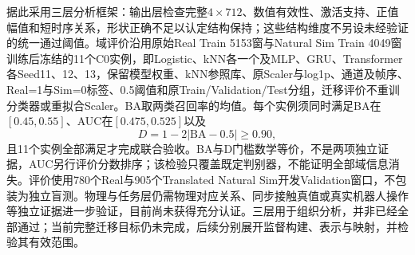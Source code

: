 据此采用三层分析框架：输出层检查完整$4\times712$、数值有效性、激活支持、正值幅值和短时序关系，形状正确不足以认定结构保持；这些结构维度不另设未经验证的统一通过阈值。域评价沿用原始Real Train 5153窗与Natural Sim Train 4049窗训练后冻结的11个C0实例，即Logistic、kNN各一个及MLP、GRU、Transformer各Seed11、12、13，保留模型权重、kNN参照库、原Scaler与log1p、通道及帧序、Real=1与Sim=0标签、0.5阈值和原Train/Validation/Test分组，迁移评价不重训分类器或重拟合Scaler。BA取两类召回率的均值。每个实例须同时满足BA在$[0.45,0.55]$、AUC在$[0.475,0.525]$以及
\begin{equation}
 D=1-2|\mathrm{BA}-0.5|\geq0.90,
 \label{eq:ch05_domain_confusion_target}
\end{equation}
且11个实例全部满足才完成联合验收。BA与D门槛数学等价，不是两项独立证据，AUC另行评价分数排序；该检验只覆盖既定判别器，不能证明全部域信息消失。评价使用780个Real与905个Translated Natural Sim开发Validation窗口，不包装为独立盲测。物理与任务层仍需物理对应关系、同步接触真值或真实机器人操作等独立证据进一步验证，目前尚未获得充分认证。三层用于组织分析，并非已经全部通过；当前完整迁移目标仍未完成，后续分别展开监督构建、表示与映射，并检验其有效范围。
